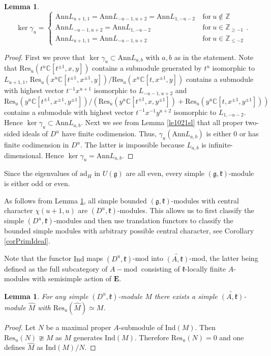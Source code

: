 \documentclass[12pt]{amsart}
\theoremstyle{plain} %
\newtheorem{lemma}[definition]{Lemma}
\newcommand{\ann}{\mathrm{Ann}}
\newcommand{\Ann}{\mathrm{Ann}}
\newcommand{\ad}{\mathrm{ad}}
\newcommand{\res}{\mathrm{Res}}
\newcommand{\ind}{\mathrm{Ind}}
\newcommand {\ZZ} {\mathbb {Z}}
\newcommand {\CC} {\mathbb {C}}
\newcommand {\EE} {\mathbf {E}}
\newcommand{\kk}{\mathfrak{k}}
\renewcommand{\gg}{\mathfrak{g}}
\renewcommand{\mod}{\mathrm{mod~}}
\newcommand{\triplebrace}[6]{\left\{\begin{array}{ll}#1 & #2 \\ #3 & #4\\ #5 & #6\end{array}\right.}
\newcommand{\refle}[1]{Lemma \ref{#1}}
\newcommand{\refcor}[1]{Corollary \ref{#1}}
\begin{document}
\begin{lemma}\label{le95}
\[
\ker\gamma_u=\triplebrace{\Ann L_{u+1,1}=\Ann L_{-u-1,u+2}=\Ann L_{1,-u-2}}{\mathrm{~for~}u\notin \ZZ}{\Ann L_{-u-1,u+2}=\Ann L_{1,-u-2}}{\mathrm{~for~} u\in \ZZ_{\geq-1}}{\Ann L_{u+1,1}=\Ann L_{-u-1,u+2}}{\mathrm{~for~}u\in \ZZ_{\leq-2}}.
\]
\end{lemma}
\begin{proof}
First we prove that $\ker\gamma_u\subset\Ann L_{a,b}$ with $a,b$ as
in the statement.  Note that
$\res_u(t^u\CC[t^{\pm 1},x,y])$ contains a submodule generated by
$t^u$ isomorphic to $L_{u+1,1}$, $\res_u(x^u\CC[t^{\pm 1},x^{\pm
  1},y])/\res_u(x^u\CC[t,x^{\pm 1},y])$ contains a submodule with
highest vector $t^{-1}x^{u+1}$ isomorphic to $L_{-u-1,u+2}$ and
$\res_u(y^u\CC[t^{\pm 1},x^{\pm 1},y^{\pm 1}])/(\res_u(y^u\CC[t^{\pm
  1},x,y^{\pm 1}])+\res_u(y^u\CC[t,x^{\pm 1},y^{\pm 1}]))$ contains a
submodule with highest vector $t^{-1}x^{-1}y^{u+2}$ isomorphic to
$L_{1,-u-2}$. Hence $\ker\gamma_u \subset \ann L_{a,b}$. Next we see
from \refle{le1021sl} that all proper two-sided ideals of $D^u$ have
finite codimension. Thus, $\gamma_u (\Ann L_{a,b})$ is either $0$ or
has finite codimension in $D^u$. The latter is impossible because
$L_{a,b}$ is infinite-dimensional. Hence $\ker\gamma_u=\Ann L_{a,b}$.
\end{proof}

Since the eigenvalues of $\ad_H$ in $U(\gg)$ are all even, every
simple $(\gg,\kk)$-module is either odd or even.

As follows from \refle{le95}, all simple bounded $(\gg,\kk)$-modules with
central character $\chi(u+1,u)$ are $(D^u,\kk)$-modules. This allows us to first classify the simple $(D^u,\kk)$-modules and then use translation
functors to classify the bounded simple modules with arbitrary possible central character, see \refcor{corPrimIdeal}. 

Note that the functor $\ind$ maps $(D^u,\kk)$-mod into $\displaystyle \widetilde{(A, \kk)}$-mod, the latter being defined as the full subcategory of $A-\mod$ consisting of $\kk$-locally finite $A$-modules with semisimple action of $\EE$.
\begin{lemma}\label{le89}
For any simple $(D^u,\kk)$-module $M$ there exists a simple $\widetilde{(A, \kk)}$-module $\hat M$ with $\res_u(\hat M)\simeq M$.
\end{lemma}
\begin{proof}
Let $N$ be a maximal proper $A$-submodule of $\ind(M)$. Then $\res_u(N)\ncong M$ as $M$ generates $\ind(M)$. Therefore $\res_u(N)=0$ and one defines $\hat M$ as $\ind(M)/N$.
\end{proof}
\end{document}
